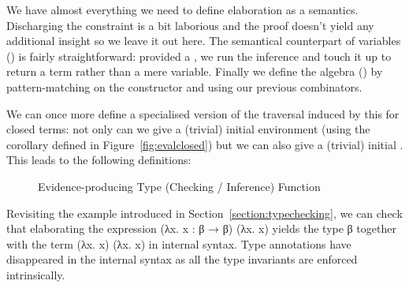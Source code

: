 We have almost everything we need to define elaboration as a semantics. Discharging
the  constraint is a bit laborious and the proof doesn't
yield any additional insight so we leave it out here. The semantical counterpart of
variables () is fairly straightforward: provided a , we run the
inference and touch it up to return a term rather than a mere variable. Finally we
define the algebra () by pattern-matching on the constructor and using our
previous combinators. 

We can once more define a specialised version of the traversal induced by this
 for closed terms: not only can we give a (trivial) initial
environment (using the  corollary defined in Figure~\ref{fig:evalclosed})
but we can also give a (trivial) initial . This leads to the
following definitions:

\begin{figure}[h]
\begin{minipage}{0.45\textwidth}
\end{minipage}\hfill
\begin{minipage}{0.45\textwidth}
\end{minipage}
\caption{Evidence-producing Type (Checking / Inference) Function}
\end{figure}

Revisiting the example introduced in Section~\ref{section:typechecking},
we can check that elaborating the expression {(λx. x : β → β) (λx. x)}
yields the type {β} together with the term {(λx. x) (λx. x)} in internal
syntax. Type annotations have disappeared in the internal syntax as all
the type invariants are enforced intrinsically.

\begin{figure}[h]
\end{figure}
